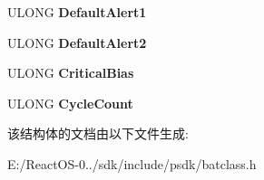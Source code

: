 \begin{DoxyCompactItemize}
U\+L\+O\+NG {\bfseries Default\+Alert1}
\item 
\mbox{\label{struct___b_a_t_t_e_r_y___i_n_f_o_r_m_a_t_i_o_n_a80bf5a7bca26f8750f18876f8d3595a5}} 
U\+L\+O\+NG {\bfseries Default\+Alert2}
\item 
\mbox{\label{struct___b_a_t_t_e_r_y___i_n_f_o_r_m_a_t_i_o_n_a9f2116ab4f3d4403d6440a0043c72643}} 
U\+L\+O\+NG {\bfseries Critical\+Bias}
\item 
\mbox{\label{struct___b_a_t_t_e_r_y___i_n_f_o_r_m_a_t_i_o_n_af4c87279742e0a5966474c2c43b7357b}} 
U\+L\+O\+NG {\bfseries Cycle\+Count}
\end{DoxyCompactItemize}


该结构体的文档由以下文件生成\+:\begin{DoxyCompactItemize}
\item 
E\+:/\+React\+O\+S-\/0../sdk/include/psdk/batclass.\+h\end{DoxyCompactItemize}
